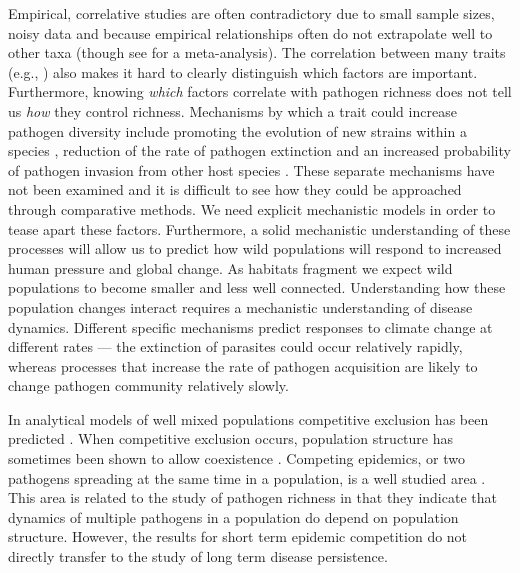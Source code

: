 Empirical, correlative studies are often contradictory due to small sample sizes, noisy data and because empirical relationships often do not extrapolate well to other taxa (though see \textcite{kamiya2014determines} for a meta-analysis).
The correlation between many traits (e.g., \textcite{nunn2015infectious}) also makes it hard to clearly distinguish which factors are important.
Furthermore, knowing \emph{which} factors correlate with pathogen richness does not tell us \emph{how} they control richness. 
Mechanisms by which a trait could increase pathogen diversity include promoting the evolution of new strains within a species \cite{buckee2004effects}, reduction of the rate of pathogen extinction \cite{rand1995invasion} and an increased probability of pathogen invasion from other host species \cite{nunes2006localized}.
These separate mechanisms have not been examined and it is difficult to see how they could be approached through comparative methods.
We need explicit mechanistic models in order to tease apart these factors.
Furthermore, a solid mechanistic understanding of these processes will allow us to predict how wild populations will respond to increased human pressure and global change.
As habitats fragment we expect wild populations to become smaller and less well connected.
Understanding how these population changes interact requires a mechanistic understanding of disease dynamics.
Different specific mechanisms predict responses to climate change at different rates --- the extinction of parasites could occur relatively rapidly, whereas processes that increase the rate of pathogen acquisition are likely to change pathogen community relatively slowly.




 

In analytical models of well mixed populations competitive exclusion has been predicted \cite{ackleh2003competitive, bremermann1989competitive, martcheva2013competitive, qiu2013vector, allen2004sis}.
When competitive exclusion occurs, population structure has sometimes been shown to allow coexistence \cite{qiu2013vector, allen2004sis, nunes2006localized, garmer2016multistrain}.
Competing epidemics, or two pathogens spreading at the same time in a population, is a well studied area \cite{poletto2013host, poletto2015characterising, karrer2011competing}. 
This area is related to the study of pathogen richness in that they indicate that dynamics of multiple pathogens in a population do depend on population structure.
However, the results for short term epidemic competition do not directly transfer to the study of long term disease persistence.


